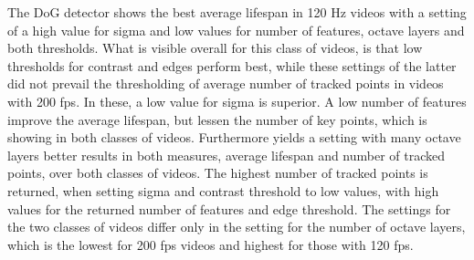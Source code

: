 \documentclass[Bachelorarbeit.tex]{subfiles}
\begin{document}
The DoG detector shows the best average lifespan in 120 Hz videos with a setting of a high value for sigma and low values for number of features, octave layers and both thresholds. What is visible overall for this class of videos, is that low thresholds for contrast and edges perform best, while these settings of the latter did not prevail the thresholding of average number of tracked points in videos with 200 fps. In these, a low value for sigma is superior. A low number of features improve the average lifespan, but lessen the number of key points, which is showing in both classes of videos. Furthermore yields a setting with many octave layers better results in both measures, average lifespan and number of tracked points, over both classes of videos. The highest number of tracked points is returned, when setting sigma and contrast threshold to low values, with high values for the returned number of features and edge threshold. The settings for the two classes of videos differ only in the setting for the number of octave layers, which is the lowest for 200 fps videos and highest for those with 120 fps.


\end{document}
